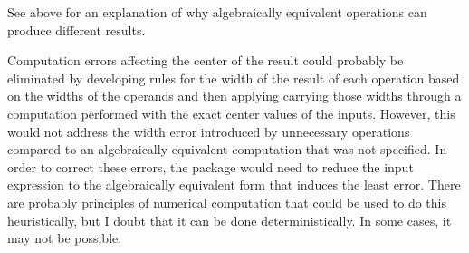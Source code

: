 \documentclass{article}
\begin{document}
See above for an explanation of why algebraically equivalent operations can
produce different results.

Computation errors affecting the center of the result could probably be
eliminated by developing rules for the width of the result of each operation
based on the widths of the operands and then applying carrying those widths
through a computation performed with the exact center values of the inputs.
However, this would not address the width error introduced by unnecessary
operations compared to an algebraically equivalent computation that was not
specified. In order to correct these errors, the package would need to reduce the
input expression to the algebraically equivalent form that induces the least
error. There are probably principles of numerical computation that could be used
to do this heuristically, but I doubt that it can be done deterministically. In
some cases, it may not be possible.
\end{document}
